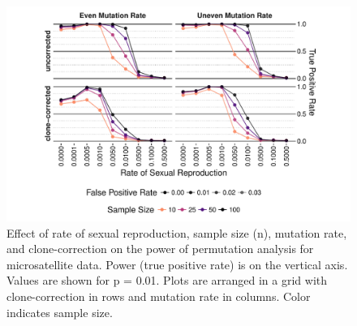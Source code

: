\documentclass[]{article}
\theoremstyle{definition}
\theoremstyle{definition}
\theoremstyle{remark}
\begin{document}
\begin{figure}
\centering
\includegraphics[width=1.00000\textwidth]{figure/ssr_power.pdf}
\caption{Effect of rate of sexual reproduction, sample size (n),
mutation rate, and clone-correction on the power of permutation analysis
for microsatellite data. Power (true positive rate) is on the vertical
axis. Values are shown for p = 0.01. Plots are arranged in a grid with
clone-correction in rows and mutation rate in columns. Color indicates
sample size.}\label{fig:sim4}
\end{figure}
\end{document}
